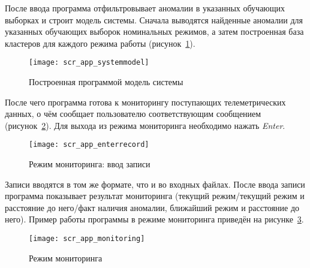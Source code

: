 После ввода программа отфильтровывает аномалии в указанных обучающих выборках и строит модель системы. Сначала выводятся найденные аномалии для указанных обучающих выборок номинальных режимов, а затем построенная база кластеров для каждого режима работы (рисунок~\ref{fig:spec:scr:SystemModel}).

\begin{figure}[h]
\texttt{[image: scr\_app\_systemmodel]}
\caption{Построенная программой модель системы}
\label{fig:spec:scr:SystemModel}
\end{figure}

После чего программа готова к мониторингу поступающих телеметрических данных, о чём сообщает пользователю соответствующим сообщением (рисунок~\ref{fig:spec:scr:EnterRecord}). Для выхода из режима мониторинга необходимо нажать \textit{Enter}.

\begin{figure}[h]
\texttt{[image: scr\_app\_enterrecord]}
\caption{Режим мониторинга: ввод записи}
\label{fig:spec:scr:EnterRecord}
\end{figure}

Записи вводятся в том же формате, что и во входных файлах. После ввода записи программа показывает результат мониторинга (текущий режим/текущий режим и расстояние до него/факт наличия аномалии, ближайший режим и расстояние до него). Пример работы программы в режиме мониторинга приведён на рисунке~\ref{fig:spec:scr:Monitoring}.

\begin{figure}[h]
\texttt{[image: scr\_app\_monitoring]}
\caption{Режим мониторинга}
\label{fig:spec:scr:Monitoring}
\end{figure}